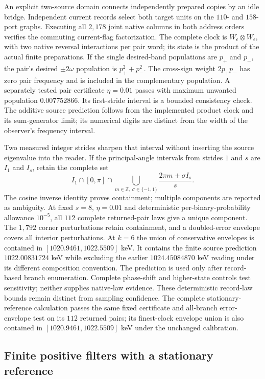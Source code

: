 An explicit two-source domain connects independently prepared copies by an
idle bridge. Independent current records select both target units on the
$110$- and $158$-port graphs. Executing all $2{,}178$ joint native columns
in both address orders verifies the commuting current-flag factorization.
The complete clock is $W_\epsilon\otimes W_\epsilon$, with two native
reversal interactions per pair word; its state is the product of the actual
finite preparations. If the single desired-band populations are $p_+$ and
$p_-$, the pair's desired $\pm2\omega$ population is $p_+^2+p_-^2$.
The cross-sign weight $2p_+p_-$ has zero pair frequency and is included in
the complementary population. A separately tested pair certificate
$\eta=0.01$ passes with maximum unwanted population $0.007752866$.
Its first-stride interval is a bounded consistency check. The additive
source prediction follows from the implemented product clock and its
sum-generator limit; its numerical digits are distinct from the width of
the observer's frequency interval.

Two measured integer strides sharpen that interval without inserting the
source eigenvalue into the reader. If the principal-angle intervals from
strides $1$ and $s$ are $I_1$ and $I_s$, retain the complete set
\[
 I_1\cap[0,\pi]\cap
 \bigcup_{m\in\mathbb Z,\ \sigma\in\{-1,1\}}
 \frac{2\pi m+\sigma I_s}{s}.
\]
The cosine inverse identity proves containment; multiple components are
reported as ambiguity. At fixed $s=8$, $\eta=0.01$ and deterministic
per-binary-probability allowance $10^{-5}$, all $112$ complete returned-pair
laws give a unique component. The $1{,}792$ corner perturbations retain
containment, and a doubled-error envelope covers all interior perturbations.
At $k=6$ the union of conservative envelopes is contained in
$[1020.9461,1022.5509]$ keV. It contains the finite source prediction
$1022.00831724$ keV while excluding the earlier $1024.45084870$ keV reading
under its different composition convention. The prediction is used only
after record-based branch enumeration. Complete phase-shift and higher-state
controls test sensitivity; neither supplies native-law evidence. These
deterministic record-law bounds remain distinct from sampling confidence.
The complete stationary-reference calculation passes the same fixed
certificate and all-branch error-envelope test on its $112$ returned pairs;
its finest-clock envelope union is also contained in
$[1020.9461,1022.5509]$ keV under the unchanged calibration.


\subsection{Finite positive filters with a stationary reference}
\label{subsec:finite-positive-source-filters}

